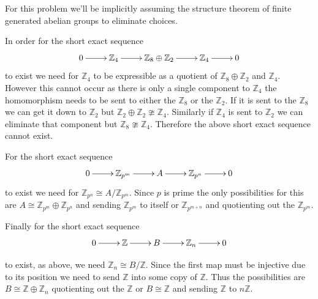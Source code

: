 \documentclass[10pt]{article}
\newcommand{\sk}{\vskip 2mm}
\newcommand{\bb}[1]{\mathbb{#1}}
\theoremstyle{plain}
\theoremstyle{remark}
\begin{document}
For this problem we'll be implicitly assuming the structure theorem of finite
generated abelian groups to eliminate choices.


In order for the short exact sequence
\[
  \xymatrix{0 \ar[r] & \bb{Z}_4 \ar[r] & \bb{Z}_8\oplus \bb{Z}_2\ar[r] &\bb{Z}_4 \ar[r] & 0}
\]
to exist we need for $\bb{Z}_4$ to be expressible as a quotient of
$\bb{Z}_8\oplus \bb{Z}_2$ and $\bb{Z}_4$. However this cannot occur as there is only
a single component to $\bb{Z}_4$ the homomorphism needs to be sent to either
the $\bb{Z}_8$ or the $\bb{Z}_2$. If it is sent to the $\bb{Z}_8$ we can get it
down to $\bb{Z}_2$ but $\bb{Z}_2\oplus\bb{Z}_2\ncong \bb{Z}_4$. Similarly if
$\bb{Z}_4$ is sent to $\bb{Z}_2$ we can eliminate that component but
$\bb{Z}_8\ncong \bb{Z}_4$. Therefore the above short exact sequence cannot
exist.

For the short exact sequence
\[
  \xymatrix{0 \ar[r] & \bb{Z}_{p^m} \ar[r] & A \ar[r] & \bb{Z}_{p^n}\ar[r] & 0}
\]
to exist we need for $\bb{Z}_{p^n}\cong A/\bb{Z}_{p^m}$. Since $p$ is prime the
only possibilities for this are $A\cong \bb{Z}_{p^m}\oplus\bb{Z}_{p^n}$ and sending
$\bb{Z}_{p^m}$ to itself or $\bb{Z}_{p^{m+n}}$ and quotienting out the $\bb{Z}_{p^m}$.


Finally for the short exact sequence
\[
  \xymatrix{0 \ar[r] & \bb{Z} \ar[r] & B \ar[r] & \bb{Z}_n\ar[r] & 0}
\]

to exist, as above, we need $\bb{Z}_n\cong B/\bb{Z}$. Since the first map
must be injective due to its position we need to send $\bb{Z}$ into
some copy of $\bb{Z}$. Thus the possibilities are $B\cong \bb{Z}\oplus\bb{Z}_n$
quotienting out the $\bb{Z}$ or $B\cong\bb{Z}$ and sending $\bb{Z}$ to $n\bb{Z}$.

\sk

\end{document}
